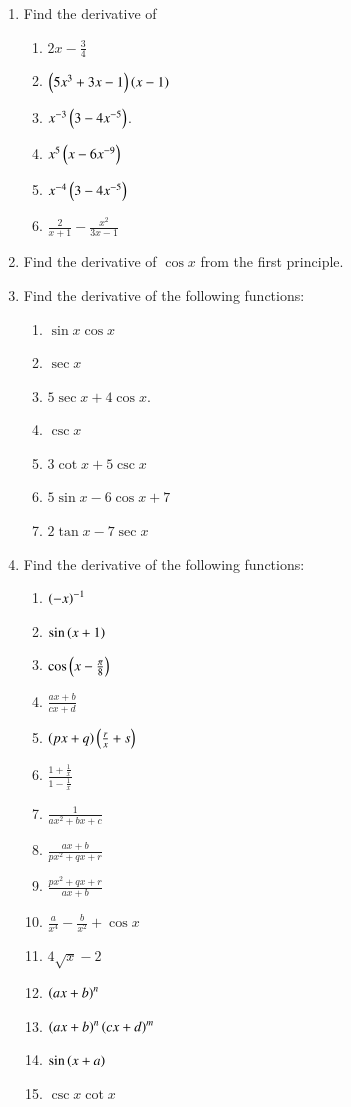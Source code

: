 \begin{enumerate}[label=\arabic*.,ref=\thesubsection.\theenumi]
\item Find the derivative of 
%
\begin{enumerate}
\item  $2x-\frac{3}{4}$
\item  $\left(5x^3+3x-1\right)\left(x-1\right)$
\item  $x^{-3}\left(3-4x^{-5}\right)$.
\item  $x^5\left(x-6x^{-9}\right)$
\item  $x^{-4}\left(3-4x^{-5}\right)$
\item  $\frac{2}{x+1} - \frac{x^2}{3x-1}$
\end{enumerate}
%
\item Find the derivative of $\cos x$ from the first principle.
%
\item Find the derivative of the following functions:
%
\begin{enumerate}
\item  $\sin x \cos x$
\item  $\sec x$
\item  $5\sec x + 4 \cos x$.
\item  $\csc x$
\item  $3\cot x + 5 \csc x$
\item  $5\sin x - 6 \cos x + 7$
\item  $2\tan x -7 \sec x$
\end{enumerate}
%
\item Find the derivative of the following functions:
%
\begin{enumerate}[label=(\roman*)]
\item  $\left(-x\right)^{-1}$
\item  $\sin\left(x+1\right)$
\item  $\cos\left(x-\frac{\pi}{8}\right)$
\item  $\frac{ax+b}{cx+d}$
\item  $\left(px+q\right)\left(\frac{r}{x}+s\right)$
\item  $\frac{1 + \frac{1}{x}}{1-\frac{1}{x}}$
\item  $\frac{1}{ax^2+bx+c}$
\item  $\frac{ax+b}{px^2+qx+r}$
\item  $\frac{px^2+qx+r}{ax+b}$
\item  $\frac{a}{x^4}-\frac{b}{x^2}+\cos x$
\item  $4\sqrt{x}-2$
\item  $\left(ax+b\right)^n$
\item  $\left(ax+b\right)^n\left(cx+d\right)^m$
\item  $\sin\left(x+a\right)$
\item  $\csc x \cot x$

\end{enumerate}
\end{enumerate}
